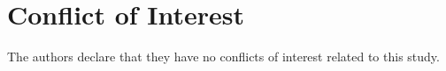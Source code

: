 \documentclass[11pt]{article}
\begin{document}
\section*{Conflict of Interest}

The authors declare that they have no conflicts of interest related to this
study.

\listoffigures
\listoftables


\end{document}
